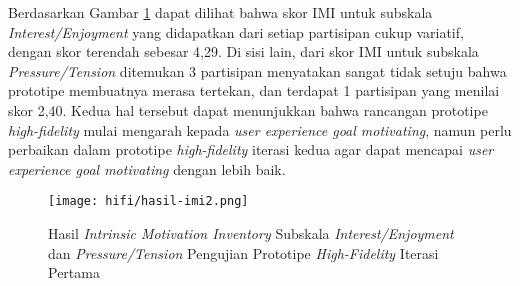 \begin{enumerate}
  \subitem  Berdasarkan Gambar \ref{img:imi2_1} dapat dilihat bahwa skor IMI untuk subskala \textit{Interest/Enjoyment} yang didapatkan dari setiap partisipan cukup variatif, dengan skor terendah sebesar 4,29. Di sisi lain, dari skor IMI untuk subskala \textit{Pressure/Tension} ditemukan 3 partisipan menyatakan sangat tidak setuju bahwa prototipe membuatnya merasa tertekan, dan terdapat 1 partisipan yang menilai skor 2,40. Kedua hal tersebut dapat menunjukkan bahwa rancangan prototipe \textit{high-fidelity} mulai mengarah kepada \textit{user experience goal motivating}, namun perlu perbaikan dalam prototipe \textit{high-fidelity} iterasi kedua agar dapat mencapai \textit{user experience goal motivating} dengan lebih baik.

  \begin{figure}[h]
    \centering
    \texttt{[image: hifi/hasil-imi2.png]}
    \caption{Hasil \textit{Intrinsic Motivation Inventory} Subskala \textit{Interest/Enjoyment} dan \textit{Pressure/Tension} Pengujian Prototipe \textit{High-Fidelity} Iterasi Pertama}
    \label{img:imi2_1}
  \end{figure}
  \FloatBarrier

\end{enumerate}




